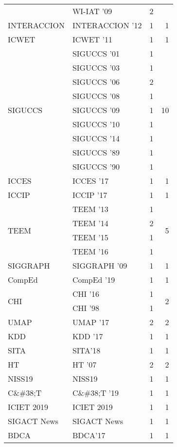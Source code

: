 \begin{table*}[t]
\begin{tabular}{llrr}
& WI-IAT '09 & 2 &\\
\multirow{1}{*}{INTERACCION } & INTERACCION '12 & 1 & \multirow{1}{*}{1}\\
\multirow{1}{*}{ICWET } & ICWET '11 & 1 & \multirow{1}{*}{1}\\
\multirow{9}{*}{SIGUCCS } & SIGUCCS '01 & 1 & \multirow{9}{*}{10}\\
& SIGUCCS '03 & 1 &\\
& SIGUCCS '06 & 2 &\\
& SIGUCCS '08 & 1 &\\
& SIGUCCS '09 & 1 &\\
& SIGUCCS '10 & 1 &\\
& SIGUCCS '14 & 1 &\\
& SIGUCCS '89 & 1 &\\
& SIGUCCS '90 & 1 &\\
\multirow{1}{*}{ICCES } & ICCES '17 & 1 & \multirow{1}{*}{1}\\
\multirow{1}{*}{ICCIP } & ICCIP '17 & 1 & \multirow{1}{*}{1}\\
\multirow{4}{*}{TEEM } & TEEM '13 & 1 & \multirow{4}{*}{5}\\
& TEEM '14 & 2 &\\
& TEEM '15 & 1 &\\
& TEEM '16 & 1 &\\
\multirow{1}{*}{SIGGRAPH } & SIGGRAPH '09 & 1 & \multirow{1}{*}{1}\\
\multirow{1}{*}{CompEd } & CompEd '19 & 1 & \multirow{1}{*}{1}\\
\multirow{2}{*}{CHI } & CHI '16 & 1 & \multirow{2}{*}{2}\\
& CHI '98 & 1 &\\
\multirow{1}{*}{UMAP } & UMAP '17 & 2 & \multirow{1}{*}{2}\\
\multirow{1}{*}{KDD } & KDD '17 & 1 & \multirow{1}{*}{1}\\
\multirow{1}{*}{SITA} & SITA'18 & 1 & \multirow{1}{*}{1}\\
\multirow{1}{*}{HT } & HT '07 & 2 & \multirow{1}{*}{2}\\
\multirow{1}{*}{NISS19} & NISS19 & 1 & \multirow{1}{*}{1}\\
\multirow{1}{*}{C\&\#38;T } & C\&\#38;T '19 & 1 & \multirow{1}{*}{1}\\
\multirow{1}{*}{ICIET 2019} & ICIET 2019 & 1 & \multirow{1}{*}{1}\\
\multirow{1}{*}{SIGACT News} & SIGACT News & 1 & \multirow{1}{*}{1}\\
\multirow{1}{*}{BDCA} & BDCA'17 & 1 & \multirow{1}{*}{1}\\

\end{tabular}
\end{table*}
